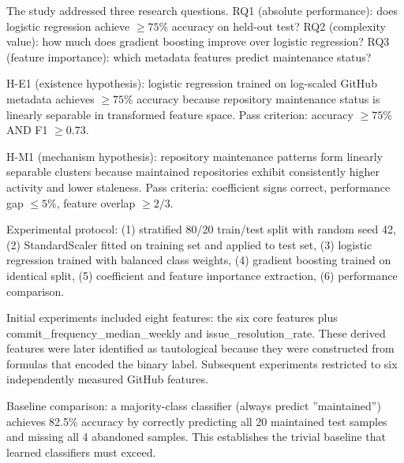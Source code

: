 
The study addressed three research questions. RQ1 (absolute performance): does logistic regression achieve $\geq 75$\% accuracy on held-out test? RQ2 (complexity value): how much does gradient boosting improve over logistic regression? RQ3 (feature importance): which metadata features predict maintenance status?

H-E1 (existence hypothesis): logistic regression trained on log-scaled GitHub metadata achieves $\geq 75$\% accuracy because repository maintenance status is linearly separable in transformed feature space. Pass criterion: accuracy $\geq 75$\% AND F1 $\geq 0.73$.

H-M1 (mechanism hypothesis): repository maintenance patterns form linearly separable clusters because maintained repositories exhibit consistently higher activity and lower staleness. Pass criteria: coefficient signs correct, performance gap $\leq 5$\%, feature overlap $\geq 2/3$.

Experimental protocol: (1) stratified 80/20 train/test split with random seed 42, (2) StandardScaler fitted on training set and applied to test set, (3) logistic regression trained with balanced class weights, (4) gradient boosting trained on identical split, (5) coefficient and feature importance extraction, (6) performance comparison.

Initial experiments included eight features: the six core features plus commit\_frequency\_median\_weekly and issue\_resolution\_rate. These derived features were later identified as tautological because they were constructed from formulas that encoded the binary label. Subsequent experiments restricted to six independently measured GitHub features.

Baseline comparison: a majority-class classifier (always predict ''maintained'') achieves 82.5\% accuracy by correctly predicting all 20 maintained test samples and missing all 4 abandoned samples. This establishes the trivial baseline that learned classifiers must exceed.
